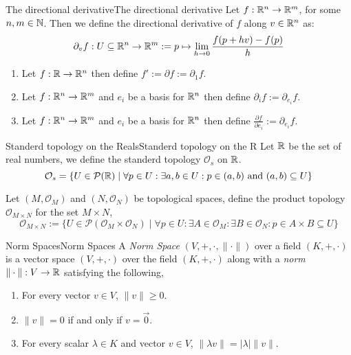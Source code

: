 \documentclass{article}
\newcommand{\tp}{\mathcal{O}}
\newcommand{\pset}[1]{\mathcal{P}(#1)}
\begin{document}
\begin{definition}{The directional derivative}{The directional derivative}
    Let $f : \mathbb{R}^n \to \mathbb{R}^m$, for some $n, m \in \mathbb{N}$.
    Then we define the directional derivative of $f$ along $v \in \mathbb{R}^n$ as:
    $$\partial_v f : U \subseteq \mathbb{R}^n \to \mathbb{R}^m := p \mapsto \lim_{h \to 0} \frac{f(p + hv) - f(p)}{h}$$
\end{definition}

\begin{notation}{}{}
    \begin{enumerate}[label=(\roman*)]
        \item Let $f: \mathbb{R} \to \mathbb{R}^n$ then define $f' := \partial f := \partial_1 f$.
        \item Let $f: \mathbb{R}^n \to \mathbb{R}^m$ and $e_i$ be a basis for $\mathbb{R}^n$ then define $\partial_i f := \partial_{e_i} f$.
        \item Let $f: \mathbb{R}^n \to \mathbb{R}^m$ and $e_i$ be a basis for $\mathbb{R}^n$ then define $\frac{\partial f}{\partial e_i} := \partial_{e_i} f$.
    \end{enumerate}
\end{notation}{}{}



\begin{example}{Standerd topology on the Reals}{Standerd topology on the R}
    Let $\mathbb{R}$ be the set of real numbers, we define the standerd topology $\tp_s$ on $\mathbb{R}$.
    $$\tp_s = \{U \in \pset{\R} \mid \forall p  \in U : \exists a, b \in U : p \in (a,b) \tand (a,b) \subseteq U\}$$
\end{example}

\begin{definition}{}{}
    Let $(M, \tp_M)$ and $(N, \tp_N)$ be topological spaces, define the product topology $\tp_{M \times N}$ for the set $M \times N$,
    $$\tp_{M \times N}  := \{U \in \pset{\tp_M \times \tp_N} \mid \forall p \in U : \exists A \in \tp_M : \exists B \in \tp_N : p \in A \times B \subseteq U\}$$
\end{definition}



\begin{definition}{Norm Spaces}{Norm Spaces}
    A \emph{Norm Space} $\left(V, +, \cdot, \|\cdot\|\right)$ over a field $\left(K, +, \cdot\right)$
    is a vector space $\left(V, +, \cdot\right)$ over the field $\left(K, +, \cdot\right)$ along with a \emph{norm} $\|\cdot\| : V \to \mathbb{R}$  satisfying the following,

    \begin{enumerate}[label=(\roman*)]
        \item For every vector $v \in V$, $\|v\| \geq 0$.
        \item $\|v\| = 0$ if and only if $v = \vec{0}$.
        \item For every scalar $\lambda \in K$ and vector $v \in V$, $\|\lambda v\| = |\lambda|\|v\|$.
    \end{enumerate}
\end{definition}
\end{document}
